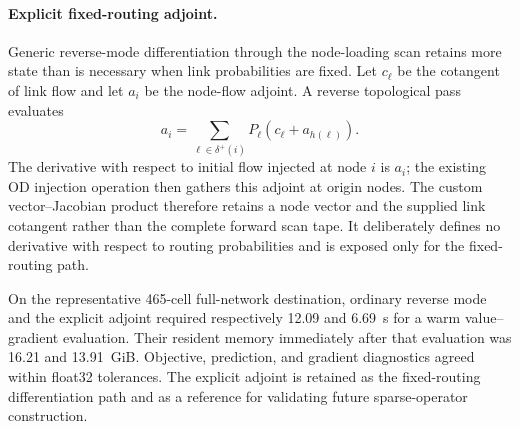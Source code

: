\paragraph{Explicit fixed-routing adjoint.}
Generic reverse-mode differentiation through the node-loading scan retains more
state than is necessary when link probabilities are fixed. Let $c_\ell$ be the
cotangent of link flow and let $a_i$ be the node-flow adjoint. A reverse
topological pass evaluates
\[
a_i=\sum_{\ell\in\delta^+(i)}P_\ell
\left(c_\ell+a_{h(\ell)}\right).
\]
The derivative with respect to initial flow injected at node $i$ is $a_i$; the
existing OD injection operation then gathers this adjoint at origin nodes. The
custom vector--Jacobian product therefore retains a node vector and the supplied
link cotangent rather than the complete forward scan tape. It deliberately
defines no derivative with respect to routing probabilities and is exposed only
for the fixed-routing path.

On the representative 465-cell full-network destination, ordinary reverse mode
and the explicit adjoint required respectively 12.09 and 6.69~s for a warm
value--gradient evaluation. Their resident memory immediately after that
evaluation was 16.21 and 13.91~GiB. Objective, prediction, and gradient
diagnostics agreed within float32 tolerances. The explicit adjoint is retained
as the fixed-routing differentiation path and as a reference for validating
future sparse-operator construction.


